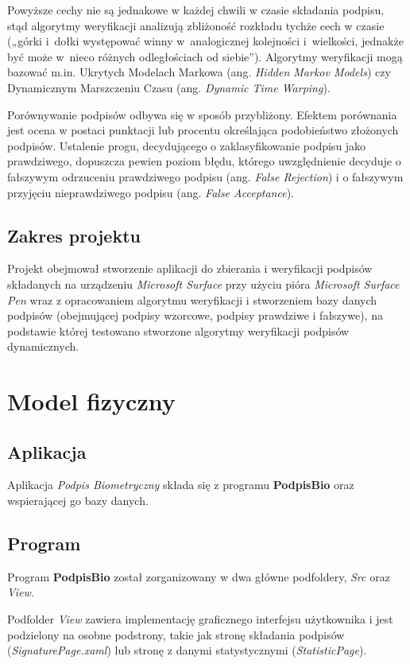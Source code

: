 \documentclass[notitlepage, oneside]{report}
\begin{document}
 Powyższe cechy nie są jednakowe w każdej chwili w czasie składania podpisu, stąd algorytmy weryfikacji analizują zbliżoność rozkładu tychże cech w czasie („górki i dołki występować winny w analogicznej kolejności i wielkości, jednakże być może w nieco różnych odległościach od siebie”). Algorytmy weryfikacji mogą bazować m.in. Ukrytych Modelach Markowa (ang. \textit{Hidden Markov Models}) czy Dynamicznym Marszczeniu Czasu (ang. \textit{Dynamic Time Warping}).

 Porównywanie podpisów odbywa się w sposób przybliżony. Efektem porównania jest ocena w postaci punktacji lub procentu określająca podobieństwo złożonych podpisów. Ustalenie progu, decydującego o zaklasyfikowanie podpisu jako prawdziwego, dopuszcza pewien poziom błędu, którego uwzględnienie decyduje o fałszywym odrzuceniu prawdziwego podpisu (ang. \textit{False Rejection}) i o fałszywym przyjęciu nieprawdziwego podpisu (ang. \textit{False Acceptance}).
\section*{Zakres projektu}
Projekt obejmował stworzenie aplikacji do zbierania i weryfikacji podpisów składanych na urządzeniu \textit{Microsoft Surface} przy użyciu pióra \textit{Microsoft Surface Pen} wraz z opracowaniem algorytmu weryfikacji i stworzeniem bazy danych podpisów (obejmującej podpisy wzorcowe, podpisy prawdziwe i fałszywe), na podstawie której testowano stworzone algorytmy weryfikacji podpisów dynamicznych.

\chapter*{Model fizyczny}
\section*{Aplikacja}
Aplikacja \textit{Podpis Biometryczny} składa się z programu \textbf{PodpisBio} oraz wspierającej go bazy danych.
\section*{Program}
     Program \textbf{PodpisBio} został zorganizowany w dwa główne podfoldery, \textit{Src} oraz \textit{View}.
     
     Podfolder \textit{View} zawiera implementację graficznego interfejsu użytkownika i jest podzielony na osobne podstrony, takie jak stronę składania podpisów (\textit{SignaturePage.xaml}) lub stronę z danymi statystycznymi (\textit{StatisticPage}).
     
\end{document}
